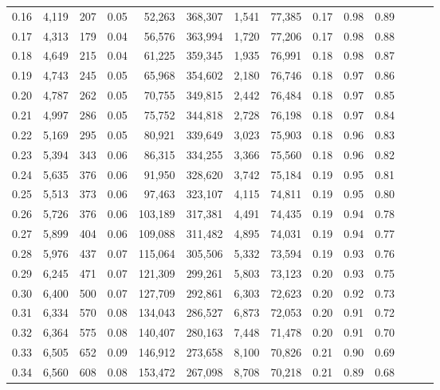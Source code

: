\begin{tabular}{rrrrrrrrrrrrrr}
0.16 &  4,119 &    207 &  0.05 &   52,263 &  368,307 &   1,541 &  77,385 &  0.17 &  0.98 &      0.89 \\
0.17 &  4,313 &    179 &  0.04 &   56,576 &  363,994 &   1,720 &  77,206 &  0.17 &  0.98 &      0.88 \\
0.18 &  4,649 &    215 &  0.04 &   61,225 &  359,345 &   1,935 &  76,991 &  0.18 &  0.98 &      0.87 \\
0.19 &  4,743 &    245 &  0.05 &   65,968 &  354,602 &   2,180 &  76,746 &  0.18 &  0.97 &      0.86 \\
0.20 &  4,787 &    262 &  0.05 &   70,755 &  349,815 &   2,442 &  76,484 &  0.18 &  0.97 &      0.85 \\
0.21 &  4,997 &    286 &  0.05 &   75,752 &  344,818 &   2,728 &  76,198 &  0.18 &  0.97 &      0.84 \\
0.22 &  5,169 &    295 &  0.05 &   80,921 &  339,649 &   3,023 &  75,903 &  0.18 &  0.96 &      0.83 \\
0.23 &  5,394 &    343 &  0.06 &   86,315 &  334,255 &   3,366 &  75,560 &  0.18 &  0.96 &      0.82 \\
0.24 &  5,635 &    376 &  0.06 &   91,950 &  328,620 &   3,742 &  75,184 &  0.19 &  0.95 &      0.81 \\
0.25 &  5,513 &    373 &  0.06 &   97,463 &  323,107 &   4,115 &  74,811 &  0.19 &  0.95 &      0.80 \\
0.26 &  5,726 &    376 &  0.06 &  103,189 &  317,381 &   4,491 &  74,435 &  0.19 &  0.94 &      0.78 \\
0.27 &  5,899 &    404 &  0.06 &  109,088 &  311,482 &   4,895 &  74,031 &  0.19 &  0.94 &      0.77 \\
0.28 &  5,976 &    437 &  0.07 &  115,064 &  305,506 &   5,332 &  73,594 &  0.19 &  0.93 &      0.76 \\
0.29 &  6,245 &    471 &  0.07 &  121,309 &  299,261 &   5,803 &  73,123 &  0.20 &  0.93 &      0.75 \\
0.30 &  6,400 &    500 &  0.07 &  127,709 &  292,861 &   6,303 &  72,623 &  0.20 &  0.92 &      0.73 \\
0.31 &  6,334 &    570 &  0.08 &  134,043 &  286,527 &   6,873 &  72,053 &  0.20 &  0.91 &      0.72 \\
0.32 &  6,364 &    575 &  0.08 &  140,407 &  280,163 &   7,448 &  71,478 &  0.20 &  0.91 &      0.70 \\
0.33 &  6,505 &    652 &  0.09 &  146,912 &  273,658 &   8,100 &  70,826 &  0.21 &  0.90 &      0.69 \\
0.34 &  6,560 &    608 &  0.08 &  153,472 &  267,098 &   8,708 &  70,218 &  0.21 &  0.89 &      0.68 \\

\end{tabular}
